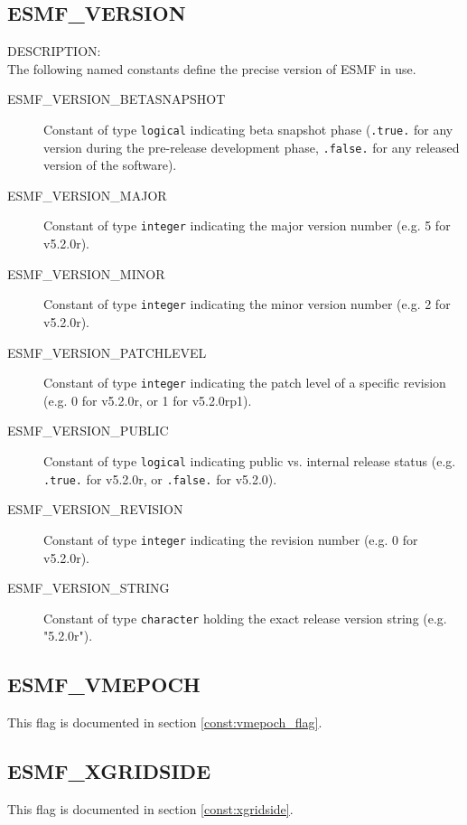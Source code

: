 \subsection{ESMF\_VERSION}
\label{const:version}

{\sf DESCRIPTION:\\}
The following named constants define the precise version of ESMF in use.

\begin{description}
\item [ESMF\_VERSION\_BETASNAPSHOT]
      Constant of type {\tt logical} indicating beta snapshot phase
      ({\tt .true.} for any version during the pre-release development phase,
      {\tt .false.} for any released version of the software).
\item [ESMF\_VERSION\_MAJOR]
      Constant of type {\tt integer} indicating the major version number
      (e.g. 5 for v5.2.0r).
\item [ESMF\_VERSION\_MINOR]
      Constant of type {\tt integer} indicating the minor version number
      (e.g. 2 for v5.2.0r).
\item [ESMF\_VERSION\_PATCHLEVEL]
      Constant of type {\tt integer} indicating the patch level of a specific
      revision (e.g. 0 for v5.2.0r, or 1 for v5.2.0rp1).
\item [ESMF\_VERSION\_PUBLIC]
      Constant of type {\tt logical} indicating public vs. internal release
      status (e.g. {\tt .true.} for v5.2.0r, or {\tt .false.} for v5.2.0).
\item [ESMF\_VERSION\_REVISION]
      Constant of type {\tt integer} indicating the revision number
      (e.g. 0 for v5.2.0r).
\item [ESMF\_VERSION\_STRING]
      Constant of type {\tt character} holding the exact release version string
      (e.g. "5.2.0r").
\end{description}

\subsection{ESMF\_VMEPOCH}
This flag is documented in section \ref{const:vmepoch_flag}.

\subsection{ESMF\_XGRIDSIDE}
This flag is documented in section \ref{const:xgridside}.
